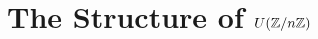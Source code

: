 \documentclass[../I&R.tex]{subfiles}
\begin{document}
\chapter{The Structure of \texorpdfstring{$U(\mathbb{Z}/n\mathbb{Z})$}{U(Z/nZ)}}

\subsection*{}
\end{document}
